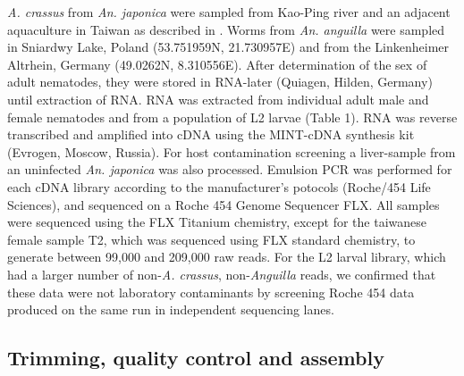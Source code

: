 \documentclass[10pt]{bmc_article}
\newenvironment{bmcformat}{\begin{raggedright}\baselineskip20pt\sloppy\setboolean{publ}{false}}{\end{raggedright}\baselineskip20pt\sloppy}
\begin{document}
\begin{bmcformat}
\textit{A. crassus} from \textit{An. japonica} were sampled from
Kao-Ping river and an adjacent aquaculture in Taiwan as described in
\cite{heitlinger_massive_2009}. Worms from \textit{An. anguilla} were sampled
in Sniardwy Lake, Poland (53.751959N, 21.730957E) and from the
Linkenheimer Altrhein, Germany (49.0262N, 8.310556E). After
determination of the sex of adult nematodes, they were stored in
RNA-later (Quiagen, Hilden, Germany) until extraction of RNA. RNA was
extracted from individual adult male and female nematodes and from a
population of L2 larvae (Table 1). RNA was reverse transcribed and
amplified into cDNA using the MINT-cDNA synthesis kit (Evrogen,
Moscow, Russia).  For host contamination screening a liver-sample from
an uninfected \textit{An. japonica} was also processed.  Emulsion PCR
was performed for each cDNA library according to the manufacturer’s
potocols (Roche/454 Life Sciences), and sequenced on a Roche 454
Genome Sequencer FLX. All samples were sequenced using the FLX
Titanium chemistry, except for the taiwanese female sample T2, which
was sequenced using FLX standard chemistry, to generate between 99,000
and 209,000 raw reads. For the L2 larval library, which had a larger
number of non-\textit{A. crassus}, non-\textit{Anguilla} reads, we
confirmed that these data were not laboratory contaminants by
screening Roche 454 data produced on the same run in independent
sequencing lanes.


\subsection*{Trimming, quality control and assembly}


\end{bmcformat}
\end{document}
